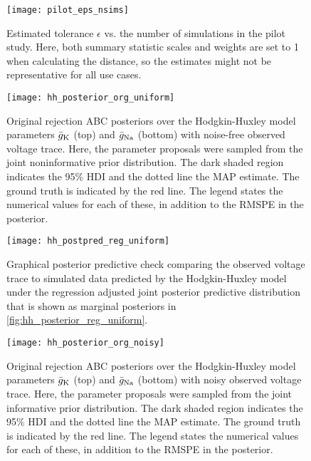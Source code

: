 
\begin{figure}[H]
    \centering
    \texttt{[image: pilot\_eps\_nsims]}
    \caption{Estimated tolerance $\epsilon$ vs. the number of simulations in the pilot study. Here, both summary statistic scales and weights are set to 1 when calculating the distance, so the estimates might not be representative for all use cases.}
\end{figure} 



\begin{figure}[H]
    \centering
    \texttt{[image: hh\_posterior\_org\_uniform]}
    \caption{Original rejection ABC posteriors over the Hodgkin-Huxley model parameters $\bar{g}_{\mathrm{K}}$ (top) and $\bar{g}_{\mathrm{Na}}$ (bottom) with noise-free observed voltage trace. Here, the parameter proposals were sampled from the joint noninformative prior distribution. The dark shaded region indicates the 95\% HDI and the dotted line the MAP estimate. The ground truth is indicated by the red line. The legend states the numerical values for each of these, in addition to the RMSPE in the posterior.}
\end{figure}


\begin{figure}[H]
    \centering
    \texttt{[image: hh\_postpred\_reg\_uniform]}
    \caption{Graphical posterior predictive check comparing the observed voltage trace to simulated data predicted by the Hodgkin-Huxley model under the regression adjusted joint posterior predictive distribution that is shown as marginal posteriors in \autoref{fig:hh_posterior_reg_uniform}.}
\end{figure}


\begin{figure}[H]
    \centering
    \texttt{[image: hh\_posterior\_org\_noisy]}
    \caption{Original rejection ABC posteriors over the Hodgkin-Huxley model parameters $\bar{g}_{\mathrm{K}}$ (top) and $\bar{g}_{\mathrm{Na}}$ (bottom) with noisy observed voltage trace. Here, the parameter proposals were sampled from the joint informative prior distribution. The dark shaded region indicates the 95\% HDI and the dotted line the MAP estimate. The ground truth is indicated by the red line. The legend states the numerical values for each of these, in addition to the RMSPE in the posterior.}
    \label{fig:hh_posterior_org_noisy}
\end{figure} 






